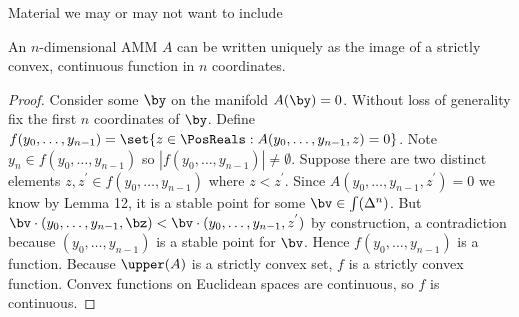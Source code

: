 Material we may or may not want to include


\begin{lemma}
  An $n$-dimensional AMM $A$ can be written uniquely as the image of a strictly convex, continuous function in $n$ coordinates.
\end{lemma}

\begin{proof}
    Consider some $\by$ on the manifold $A(\by) = 0$.
    Without loss of generality fix the first $n$ coordinates of $\by$.
    Define
    $f(y_0,\ldots,y_{n-1}) = \set{z \in \PosReals : A(y_0,\ldots,y_{n-1},z)=0}$.
    Note $y_n \in f(y_0,\ldots,y_{n-1})$ so 
    $|f(y_0,\ldots,y_{n-1})| \neq \emptyset$.
    Suppose there are two distinct elements $z,z^{'} \in f(y_0,\ldots,y_{n-1}) $
    where $z < z^{'}$.
    Since $A(y_0,\ldots,y_{n-1},z^{'}) = 0$ we know by Lemma 12,
    it is a stable point for some $\bv \in \int(\Delta^n)$.
    But $\bv \cdot (y_0,\ldots,y_{n-1},\bz) < \bv \cdot (y_0,\ldots,y_{n-1},z^{'})$ by construction,
    a contradiction because $(y_0,\ldots,y_{n-1})$ is a stable point for $\bv$.
    Hence $f(y_0,\ldots,y_{n-1})$ is a function.
    Because $\upper(A)$ is a strictly convex set,
    $f$ is a strictly convex function.
    Convex functions on Euclidean spaces are continuous, 
    so $f$ is continuous.
\end{proof}
